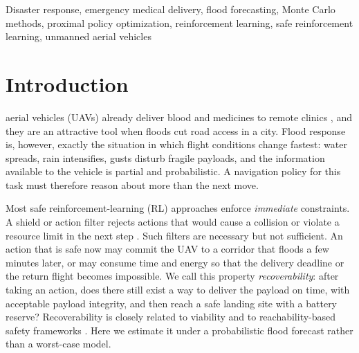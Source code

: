 \documentclass{ieeeaccess}
\begin{document}
\begin{keywords}
Disaster response, emergency medical delivery, flood forecasting, Monte Carlo methods, proximal policy optimization, reinforcement learning, safe reinforcement learning, unmanned aerial vehicles
\end{keywords}

\titlepgskip=-15pt

\maketitle

\section{Introduction}
\label{sec:introduction}
 aerial vehicles (UAVs) already deliver blood and medicines to remote clinics \cite{ackerman2019}, and they are an attractive tool when floods cut road access in a city. Flood response is, however, exactly the situation in which flight conditions change fastest: water spreads, rain intensifies, gusts disturb fragile payloads, and the information available to the vehicle is partial and probabilistic. A navigation policy for this task must therefore reason about more than the next move.

Most safe reinforcement-learning (RL) approaches enforce \emph{immediate} constraints. A shield or action filter rejects actions that would cause a collision or violate a resource limit in the next step \cite{alshiekh2018,garcia2015}. Such filters are necessary but not sufficient. An action that is safe now may commit the UAV to a corridor that floods a few minutes later, or may consume time and energy so that the delivery deadline or the return flight becomes impossible. We call this property \emph{recoverability}: after taking an action, does there still exist a way to deliver the payload on time, with acceptable payload integrity, and then reach a safe landing site with a battery reserve? Recoverability is closely related to viability \cite{aubin1991} and to reachability-based safety frameworks \cite{fisac2019}. Here we estimate it under a probabilistic flood forecast rather than a worst-case model.
\end{document}
